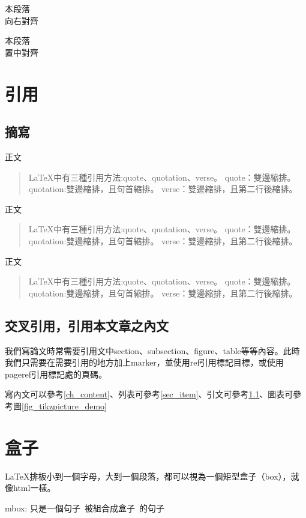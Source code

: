 \begin{flushright}
    本段落\\
    向右對齊
\end{flushright}

\begin{center}
    本段落\\
    置中對齊
\end{center}

\section{引用}
\subsection{摘寫}\label{ssec_qute}
正文
\begin{quote}
    \LaTeX 中有三種引用方法:quote、quotation、verse。
    quote：雙邊縮排。
    quotation:雙邊縮排，且句首縮排。
    verse：雙邊縮排，且第二行後縮排。
\end{quote}
正文
\begin{quotation}
    \LaTeX 中有三種引用方法:quote、quotation、verse。
    quote：雙邊縮排。
    quotation:雙邊縮排，且句首縮排。
    verse：雙邊縮排，且第二行後縮排。
\end{quotation}
正文
\begin{verse}
    \LaTeX 中有三種引用方法:quote、quotation、verse。
    quote：雙邊縮排。
    quotation:雙邊縮排，且句首縮排。
    verse：雙邊縮排，且第二行後縮排。
\end{verse}

\subsection{交叉引用，引用本文章之內文}
我們寫論文時常需要引用文中section、subsection、figure、table等等內容。此時我們只需要在需要引用的地方加上marker，並使用ref引用標記目標，或使用pageref引用標記處的頁碼。

寫內文可以參考\ref{ch_content}、列表可參考\ref{sec_item}、引文可參考\ref{ssec_qute}、圖表可參考圖\ref{fig_tikzpicture_demo}

\newpage
\section{盒子}
\LaTeX 排板小到一個字母，大到一個段落，都可以視為一個矩型盒子（box），就像html一樣。

mbox:
\mbox{只是一個句子 被組合成盒子 的句子}

